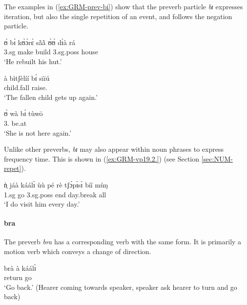 \begin{exe}
\begin{exe}
\begin{exe}
{\begin{exe}
\begin{exe}
\begin{exe}
\begin{exe}
\begin{exe}
\begin{exe}
\begin{exe}
\begin{xlist}
\begin{exe}
\begin{exe}
\begin{exe}
\begin{exe}
\begin{exe}
\begin{exe}
\begin{exe}
\begin{exe}
\begin{exe}
\begin{exe}
\begin{exe}
\begin{exe}
\begin{exe}
\begin{exe}
The examples in (\ref{ex:GRM-prev-bi}) show that  the preverb particle {\it bɪ}
expresses iteration, but also the single repetition of an event, and follows the
negation particle. 



\ea\label{ex:GRM-prev-bi}

\ea\label{ex:vp33.2.}
\gll ʊ̀ bɪ́ kʊ̀ɔ̀rɛ̀ sã̀ã̀ ʊ̀ʊ̀ dɪ̀à rá \\
 {\sc 3.sg}     {\itr} make build {\sc 3.sg.poss} house {\foc}    \\
\glt  `He rebuilt his hut.' 


\ex\label{ex:GRM-vp10.4}
\gll à bìtʃèlíí bɪ́ sīīú\\
 {\art}  child.fall   {\itr} raise.{\foc}    \\
\glt  `The fallen child gets up again.' 



\ex\label{ex:vp10.4.}
\gll ʊ̀ wà bɪ́ tùwō \\
       {3.\sg} {\neg} {\itr} be.at\\
\glt  `She is not here again.' 

\z 
 \z 


Unlike other preverbs,  {\it bɪ} may also appear within noun phrases to express
frequency time. This is shown in (\ref{ex:GRM-vp19.2.}) (see Section
\ref{sec:NUM-repet}).



\begin{exe} 
\ex\label{ex:GRM-vp19.2.}
\gll  ǹ̩ jáà  káálɪ̀ ùù pé rè tʃɔ̀pɪ̀sɪ̀ bíí mùŋ \\
{\sc 1.sg} {\hab} go {\sc 3.sg.poss} end {\foc}  day.break {\itr} all\\
\glt  `I do visit him every day.' 

\z 



 \paragraph{bra}
\label{sec:GRM-preverb-return}

The preverb {\it bra} has a corresponding verb with the same form. It is
primarily a motion verb which conveys a change of direction. 


\ea\label{ex:GRM-verb-bra}

\ea
\gll brà à káálɪ̀\\
return {\conn} go\\
\glt `Go back.' (Hearer coming towards speaker, speaker ask hearer to turn and 
go back)


\end{exe}
\end{exe}
\end{exe}
\end{exe}
\end{exe}
\end{exe}
\end{exe}
\end{exe}
\end{exe}
\end{exe}
\end{exe}
\end{exe}
\end{exe}
\end{exe}
\end{exe}
\end{xlist}
\end{exe}
\end{exe}
\end{exe}
\end{exe}
\end{exe}
\end{exe}
\end{exe}}
\end{exe}
\end{exe}
\end{exe}
